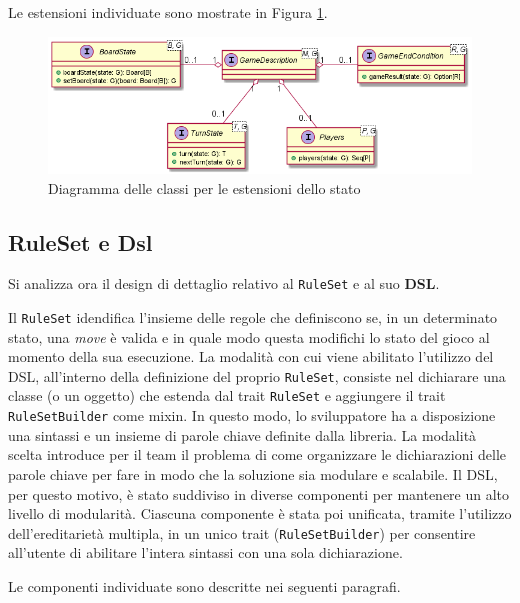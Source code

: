 Le estensioni individuate sono mostrate in Figura \ref{fig:extensions}.
%
\begin{figure}
    \centering
    \includegraphics[width=\linewidth]{images/uml/extensions.png}
    \caption{Diagramma delle classi per le estensioni dello stato}
    \label{fig:extensions}
\end{figure}

\subsection{RuleSet e Dsl}

Si analizza ora il design di dettaglio relativo al \texttt{RuleSet} e al suo \textbf{DSL}.

Il \texttt{RuleSet} idendifica l'insieme delle regole che definiscono se, in un determinato stato, una \textit{move} è valida e in quale modo questa modifichi lo stato del gioco al momento della sua esecuzione.
%
La modalità con cui viene abilitato l'utilizzo del DSL, all'interno della definizione del proprio \texttt{RuleSet}, consiste nel dichiarare una classe (o un oggetto) che estenda dal trait \texttt{RuleSet} e aggiungere il trait \texttt{RuleSetBuilder} come mixin.
%
In questo modo, lo sviluppatore ha a disposizione una sintassi e un insieme di parole chiave definite dalla libreria.
%
La modalità scelta introduce per il team il problema di come organizzare le dichiarazioni delle parole chiave per fare in modo che la soluzione sia modulare e scalabile. %
%
Il DSL, per questo motivo, è stato suddiviso in diverse componenti per mantenere un alto livello di modularità.
%
Ciascuna componente è stata poi unificata, tramite l'utilizzo dell'ereditarietà multipla, in un unico trait (\texttt{RuleSetBuilder}) per consentire all'utente di abilitare l'intera sintassi con una sola dichiarazione.

Le componenti individuate sono descritte nei seguenti paragrafi.


